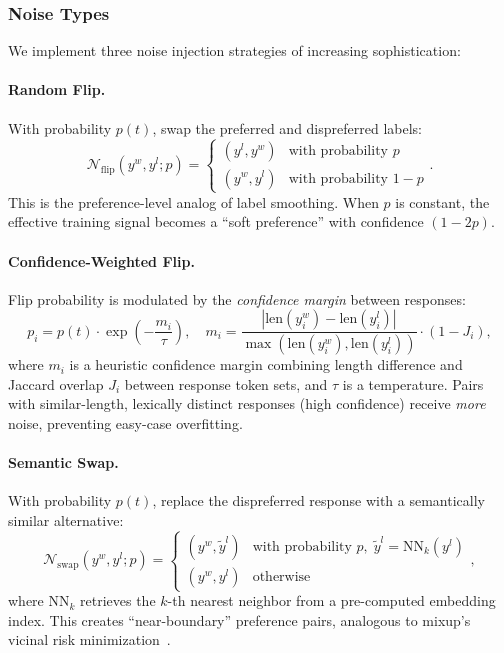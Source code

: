 \documentclass{article}
\begin{document}
\subsubsection{Noise Types}

We implement three noise injection strategies of increasing sophistication:

\paragraph{Random Flip.}
With probability $p(t)$, swap the preferred and dispreferred labels:
\begin{equation}
    \mathcal{N}_{\text{flip}}(y^w, y^l; p) = \begin{cases} (y^l, y^w) & \text{with probability } p \\ (y^w, y^l) & \text{with probability } 1-p \end{cases}.
\end{equation}
This is the preference-level analog of label smoothing.
When $p$ is constant, the effective training signal becomes a ``soft preference'' with confidence $(1 - 2p)$.

\paragraph{Confidence-Weighted Flip.}
Flip probability is modulated by the \emph{confidence margin} between responses:
\begin{equation}
    p_i = p(t) \cdot \exp\left( -\frac{m_i}{\tau} \right), \quad m_i = \frac{|\text{len}(y^w_i) - \text{len}(y^l_i)|}{\max(\text{len}(y^w_i), \text{len}(y^l_i))} \cdot (1 - J_i),
\end{equation}
where $m_i$ is a heuristic confidence margin combining length difference and Jaccard overlap $J_i$ between response token sets, and $\tau$ is a temperature.
Pairs with similar-length, lexically distinct responses (high confidence) receive \emph{more} noise, preventing easy-case overfitting.

\paragraph{Semantic Swap.}
With probability $p(t)$, replace the dispreferred response with a semantically similar alternative:
\begin{equation}
    \mathcal{N}_{\text{swap}}(y^w, y^l; p) = \begin{cases} (y^w, \tilde{y}^l) & \text{with probability } p, \; \tilde{y}^l = \text{NN}_k(y^l) \\ (y^w, y^l) & \text{otherwise} \end{cases},
\end{equation}
where $\text{NN}_k$ retrieves the $k$-th nearest neighbor from a pre-computed embedding index.
This creates ``near-boundary'' preference pairs, analogous to mixup's vicinal risk minimization~\cite{PLACEHOLDER_chapelle2001vicinal}.
\end{document}
